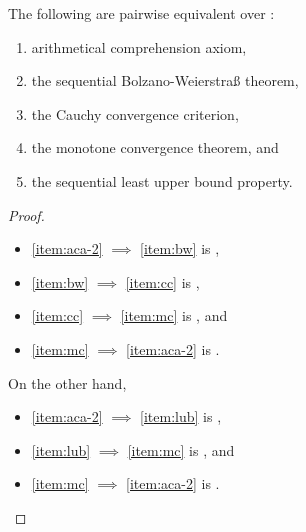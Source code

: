 \documentclass[../main.tex]{memoir}
\begin{document}
\begin{theorem}
  \label{thm:aca-equivalences}

  The following are pairwise equivalent over \rca:

  \begin{enumerate}
  \item \label{item:aca-2} arithmetical comprehension axiom,
  \item \label{item:bw} the sequential Bolzano-Weierstra{\ss} theorem,
  \item \label{item:cc} the Cauchy convergence criterion,
  \item \label{item:mc} the monotone convergence theorem, and
  \item \label{item:lub} the sequential least upper bound property.
  \end{enumerate}
\end{theorem}
\begin{proof}
  \begin{itemize}
  \item \ref{item:aca-2} $\implies$ \ref{item:bw} is ,
  \item \ref{item:bw} $\implies$ \ref{item:cc} is ,
  \item \ref{item:cc} $\implies$ \ref{item:mc} is , and
  \item \ref{item:mc} $\implies$ \ref{item:aca-2} is .
  \end{itemize}

  On the other hand,

  \begin{itemize}
  \item \ref{item:aca-2} $\implies$ \ref{item:lub} is ,
  \item \ref{item:lub} $\implies$ \ref{item:mc} is , and
  \item \ref{item:mc} $\implies$ \ref{item:aca-2} is .
  \end{itemize}
\end{proof}
\end{document}
